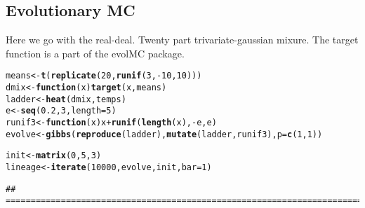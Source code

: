 \documentclass{article}\usepackage[]{graphicx}\usepackage[]{color}
\makeatletter
\newcommand{\hlnum}[1]{\textcolor[rgb]{0.686,0.059,0.569}{#1}}%
\newcommand{\hlopt}[1]{\textcolor[rgb]{0,0,0}{#1}}%
\newcommand{\hlstd}[1]{\textcolor[rgb]{0.345,0.345,0.345}{#1}}%
\newcommand{\hlkwa}[1]{\textcolor[rgb]{0.161,0.373,0.58}{\textbf{#1}}}%
\newcommand{\hlkwb}[1]{\textcolor[rgb]{0.69,0.353,0.396}{#1}}%
\newcommand{\hlkwc}[1]{\textcolor[rgb]{0.333,0.667,0.333}{#1}}%
\newcommand{\hlkwd}[1]{\textcolor[rgb]{0.737,0.353,0.396}{\textbf{#1}}}%
\newenvironment{kframe}{%
 \def\at@end@of@kframe{}%
 \ifinner\ifhmode%
  \def\at@end@of@kframe{\end{minipage}}%
  \begin{minipage}{\columnwidth}%
 \fi\fi%
 \def\FrameCommand##1{\hskip\@totalleftmargin \hskip-\fboxsep
 \colorbox{shadecolor}{##1}\hskip-\fboxsep
     \hskip-\linewidth \hskip-\@totalleftmargin \hskip\columnwidth}%
 \MakeFramed {\advance\hsize-\width
   \@totalleftmargin\z@ \linewidth\hsize
   \@setminipage}}%
 {\par\unskip\endMakeFramed%
 \at@end@of@kframe}
\newenvironment{knitrout}{}{} %
\makeatother
\begin{document}
\subsection{Evolutionary MC}

Here we go with the real-deal. Twenty part trivariate-gaussian mixure.
The target function is a part of the evolMC package. 

\begin{knitrout}
\color{fgcolor}\begin{kframe}
\begin{alltt}
\hlstd{means} \hlkwb{<-} \hlkwd{t}\hlstd{(}\hlkwd{replicate}\hlstd{(}\hlnum{20}\hlstd{,} \hlkwd{runif}\hlstd{(}\hlnum{3}\hlstd{,} \hlopt{-}\hlnum{10}\hlstd{,} \hlnum{10}\hlstd{)))}
\hlstd{dmix} \hlkwb{<-} \hlkwa{function}\hlstd{(}\hlkwc{x}\hlstd{)} \hlkwd{target}\hlstd{(x, means)}
\hlstd{ladder} \hlkwb{<-} \hlkwd{heat}\hlstd{(dmix, temps)}
\hlstd{e} \hlkwb{<-} \hlkwd{seq}\hlstd{(}\hlnum{0.2}\hlstd{,} \hlnum{3}\hlstd{,} \hlkwc{length} \hlstd{=} \hlnum{5}\hlstd{)}
\hlstd{runif3} \hlkwb{<-} \hlkwa{function}\hlstd{(}\hlkwc{x}\hlstd{) x} \hlopt{+} \hlkwd{runif}\hlstd{(}\hlkwd{length}\hlstd{(x),} \hlopt{-}\hlstd{e, e)}
\hlstd{evolve} \hlkwb{<-} \hlkwd{gibbs}\hlstd{(}\hlkwd{reproduce}\hlstd{(ladder),} \hlkwd{mutate}\hlstd{(ladder, runif3),} \hlkwc{p} \hlstd{=} \hlkwd{c}\hlstd{(}\hlnum{1}\hlstd{,} \hlnum{1}\hlstd{))}

\hlstd{init} \hlkwb{<-} \hlkwd{matrix}\hlstd{(}\hlnum{0}\hlstd{,} \hlnum{5}\hlstd{,} \hlnum{3}\hlstd{)}
\hlstd{lineage} \hlkwb{<-} \hlkwd{iterate}\hlstd{(}\hlnum{10000}\hlstd{, evolve, init,} \hlkwc{bar} \hlstd{=} \hlnum{1}\hlstd{)}
\end{alltt}
\begin{verbatim}
## ===========================================================================
\end{verbatim}
\end{kframe}
\end{knitrout}
\end{document}
